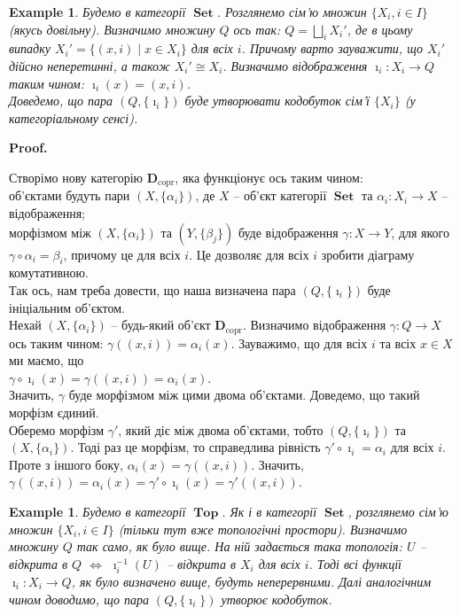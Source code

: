 \documentclass[a4paper, 10pt]{article}
\makeatletter
\theoremstyle{theoremdd}
\newtheorem{example}[theorem]{Example}
\renewenvironment{proof}[1][Proof.\\]{\par
\pushQED{\hfill \qed}%
\normalfont \topsep6\p@\@plus6\p@\relax
\trivlist
\item\relax
{\bfseries
#1\@addpunct{.}}\hspace\labelsep\ignorespaces
}{%
\popQED\endtrivlist\@endpefalse
}
\DeclareMathOperator{\Set}{\textbf{Set}}
\DeclareMathOperator{\Top}{\textbf{Top}}
\makeatother
\begin{document}
\begin{example}
Будемо в категорії $\Set$. Розглянемо сім'ю множин $\{X_i, i \in I\}$ (якусь довільну). Визначимо множину $Q$ ось так: $Q = \displaystyle\bigsqcup_{i} X_i'$, де в цьому випадку $X_i' = \{(x,i) \mid x \in X_i\}$ для всіх $i$. Причому варто зауважити, що $X_i'$ дійсно неперетинні, а також $X_i' \cong X_i$. Визначимо відображення $\imath_i \colon X_i \to Q$ таким чином: $\imath_i(x) = (x,i)$.\\
Доведемо, що пара $(Q,\{\imath_i\})$ буде утворювати кодобуток сім'ї $\{X_i\}$ (у категоріальному сенсі).
\end{example}

\begin{proof}
Створімо нову категорію $\textbf{D}_{\text{copr}}$, яка функціонує ось таким чином:\\
об'єктами будуть пари $(X,\{\alpha_i\})$, де $X$ -- об'єкт категорії $\Set$ та $\alpha_i \colon X_i \to X$ -- відображення;\\
морфізмом між $(X,\{\alpha_i\})$ та $(Y,\{\beta_j\})$ буде відображення $\gamma \colon X \to Y$, для якого $\gamma \circ \alpha_i = \beta_i$, причому це для всіх $i$. Це дозволяє для всіх $i$ зробити діаграму комутативною.\\
Так ось, нам треба довести, що наша визначена пара $(Q,\{\imath_i\})$ буде ініціальним об'єктом.\\
Нехай $(X,\{\alpha_i\})$ -- будь-який об'єкт $\textbf{D}_{\text{copr}}$. Визначимо відображення $\gamma \colon Q \to X$ ось таким чином: $\gamma((x,i)) = \alpha_i(x)$. Зауважимо, що для всіх $i$ та всіх $x \in X$ ми маємо, що\\
$\gamma \circ \imath_i(x) = \gamma((x,i)) = \alpha_i(x)$.\\
Значить, $\gamma$ буде морфізмом між цими двома об'єктами. Доведемо, що такий морфізм єдиний.\\
Оберемо морфізм $\gamma'$, який діє між двома об'єктами, тобто $(Q,\{\imath_i\})$ та $(X,\{\alpha_i\})$. Тоді раз це морфізм, то справедлива рівність $\gamma' \circ \imath_i = \alpha_i$ для всіх $i$. Проте з іншого боку, $\alpha_i(x) = \gamma((x,i))$. Значить, $\gamma((x,i)) = \alpha_i(x) = \gamma' \circ \imath_i (x) = \gamma'((x,i))$.
\end{proof}

\begin{example}
Будемо в категорії $\Top$. Як і в категорії $\Set$, розглянемо сім'ю множин $\{X_i, i \in I\}$ (тільки тут вже топологічні простори). Визначимо множину $Q$ так само, як було вище. На ній задається така топологія: $U$ -- відкрита в $Q$ $\iff$ $\imath_i^{-1}(U)$ -- відкрита в $X_i$ для всіх $i$. Тоді всі функції $\imath_i \colon X_i \to Q$, як було визначено вище, будуть неперервними. Далі аналогічним чином доводимо, що пара $(Q,\{\imath_i\})$ утворює кодобуток.
\end{example}
\end{document}
